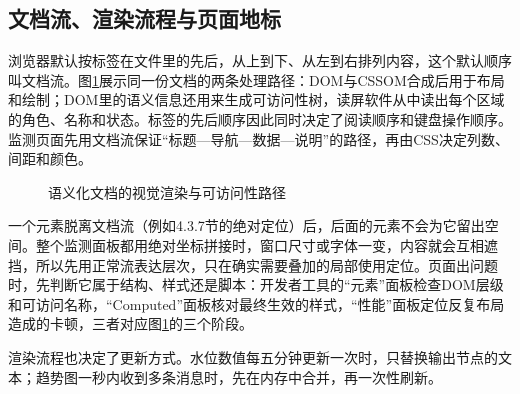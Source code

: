 \subsection{文档流、渲染流程与页面地标}

浏览器默认按标签在文件里的先后，从上到下、从左到右排列内容，这个默认顺序叫文档流。图\ref{fig:ch04-document-flow}展示同一份文档的两条处理路径：DOM与CSSOM合成后用于布局和绘制；DOM里的语义信息还用来生成可访问性树，读屏软件从中读出每个区域的角色、名称和状态。标签的先后顺序因此同时决定了阅读顺序和键盘操作顺序。监测页面先用文档流保证“标题—导航—数据—说明”的路径，再由CSS决定列数、间距和颜色。

\begin{figure}[htbp]
\centering
{}
\caption{语义化文档的视觉渲染与可访问性路径}
\label{fig:ch04-document-flow}
\end{figure}

一个元素脱离文档流（例如4.3.7节的绝对定位）后，后面的元素不会为它留出空间。整个监测面板都用绝对坐标拼接时，窗口尺寸或字体一变，内容就会互相遮挡，所以先用正常流表达层次，只在确实需要叠加的局部使用定位。页面出问题时，先判断它属于结构、样式还是脚本：开发者工具的“元素”面板检查DOM层级和可访问名称，“Computed”面板核对最终生效的样式，“性能”面板定位反复布局造成的卡顿，三者对应图\ref{fig:ch04-document-flow}的三个阶段。

渲染流程也决定了更新方式。水位数值每五分钟更新一次时，只替换输出节点的文本；趋势图一秒内收到多条消息时，先在内存中合并，再一次性刷新。


